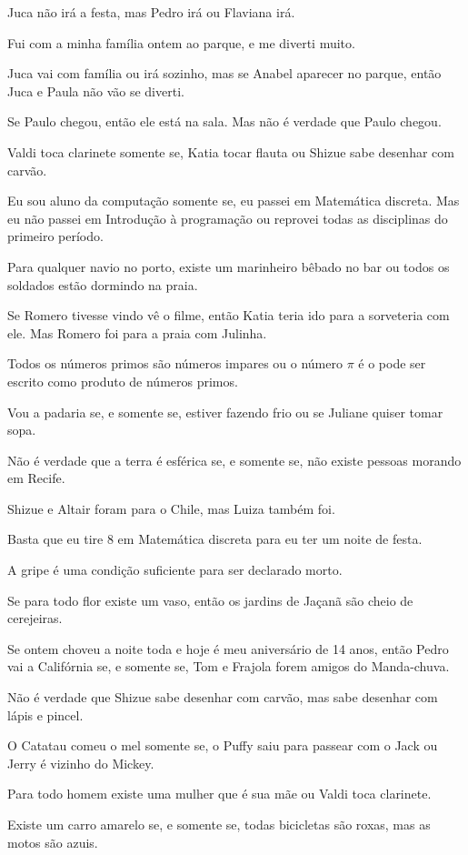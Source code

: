 \begin{exerList}
	\item Juca não irá a festa, mas Pedro irá ou Flaviana irá.
	\item Fui com a minha família ontem ao parque, e me diverti muito.
	\item Juca vai com família ou irá sozinho, mas se Anabel aparecer no parque, então Juca e Paula não vão se diverti.
	\item Se Paulo chegou, então ele está na sala. Mas não é verdade que Paulo chegou.
	\item Valdi toca clarinete somente se, Katia tocar flauta ou Shizue sabe desenhar com carvão.
	\item Eu sou aluno da computação somente se, eu passei em Matemática discreta. Mas eu não passei em Introdução à programação ou reprovei todas as disciplinas do primeiro período.
	\item Para qualquer navio no porto, existe um marinheiro bêbado no bar ou todos os soldados estão dormindo na praia.
	\item Se Romero tivesse vindo vê o filme, então Katia teria ido para a sorveteria com ele. Mas Romero foi para a praia com Julinha.
	\item Todos os números primos são números impares ou o número $\pi$ é o pode ser escrito como produto de números primos.
	\item Vou a padaria se, e somente se, estiver fazendo frio ou se Juliane quiser tomar sopa.
	\item Não é verdade que a terra é esférica se, e somente se, não existe pessoas morando em Recife.
	\item Shizue e Altair foram para o Chile, mas Luiza também foi.
	\item Basta que eu tire 8 em Matemática discreta para eu ter um noite de festa.
	\item A gripe é uma condição suficiente para ser declarado morto.
	\item Se para todo flor existe um vaso, então os jardins de Jaçanã são cheio de cerejeiras. 
	\item Se ontem choveu a noite toda e hoje é meu aniversário de 14 anos, então Pedro vai a Califórnia se, e somente se, Tom e Frajola forem amigos do Manda-chuva.
	\item Não é verdade que Shizue sabe desenhar com carvão, mas sabe desenhar com lápis e pincel.
	\item O Catatau comeu o mel somente se, o Puffy saiu para passear com o Jack ou Jerry é vizinho do Mickey.
	\item Para todo homem existe uma mulher que é sua mãe ou Valdi toca clarinete.
	\item Existe um carro amarelo se, e somente se, todas bicicletas são roxas, mas as motos são azuis. 
\end{exerList}